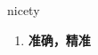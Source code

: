 
\begin{frame}
{\huge nicety}
\begin{center}
\begin{enumerate}\Large
  \item \textbf{准确，精准}
\end{enumerate}
\end{center}
\end{frame}
